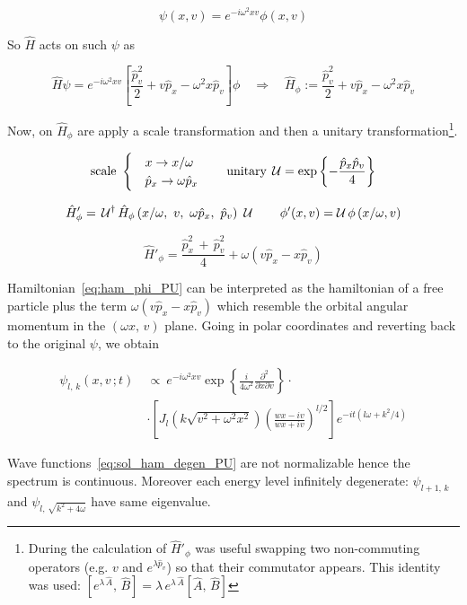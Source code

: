 \begin{equation*}
  \psi(x, v) = e^{-i\omega^2xv}\phi(x,v)
\end{equation*}

So $\hat{H}$ acts on such $\psi$ as

\begin{equation*}
  \hat{H} \psi = e^{-i\omega^2xv}
  \left[\frac{\hat{p}_v^2}{2} + v\hat{p}_x - \omega^2x\hat{p}_v \right] \phi
  \quad \Rightarrow \quad
  \hat{H}_{\phi} :=
  \frac{\hat{p}_v^2}{2} + v\hat{p}_x - \omega^2x\hat{p}_v
\end{equation*}

Now, on $\hat{H}_{\phi}$ are apply a scale transformation and then a unitary
transformation\footnote{
  During the calculation of $\hat{H}'_{\phi}$ was useful swapping
  two non-commuting operators (e.g. $v$ and $e^{\lambda \hat{p}_v}$)
  so that their commutator appears. This identity was used:
  $\left[e^{\lambda \, \hat{A}}, \, \hat{B}\right] =
  \lambda \, e^{\lambda \, \hat{A}} \left[\hat{A} , \, \hat{B} \right]$
}.

\begin{equation*}
  \text{scale} \
  \begin{cases}
    &x         \rightarrow x/\omega \\
    &\hat{p}_x \rightarrow \omega\hat{p}_x
  \end{cases}
  \qquad \text{unitary} \;
  \operatorname{\mathcal{U}} = \exp\left\{ - \frac{\hat{p}_x \hat{p}_v}{4}\right\}
\end{equation*}

\begin{equation*}
  \hat{H}'_{\phi} = \, \U^{\dagger}
  \hat{H}_{\phi} \left(x/\omega,\ v,\ \omega \hat{p}_x,\ \hat{p}_v\right)
  \ \U \qquad
  \phi'(x, v) = \U \phi\left(x/\omega, v\right)
\end{equation*}

\begin{equation} \label{eq:ham_phi_PU}
  \hat{H}'_{\phi} = \frac{\hat{p}^2_x \, + \, \hat{p}^2_{v}}{4}
  + \omega \left(v \hat{p}_x - x \hat{p}_v \right)
\end{equation}

Hamiltonian~\eqref{eq:ham_phi_PU} can be interpreted as the hamiltonian of a
free particle plus the term $\omega \left(v \hat{p}_x - x \hat{p}_v \right)$
which resemble the orbital angular momentum in the $(\omega x, \, v)$ plane.
Going in polar coordinates and reverting back to the original $\psi$, we obtain

\begin{align} \label{eq:sol_ham_degen_PU}
  \psi_{l, \, k}(x, v \,; t) \ &\propto \
  e^{-i\omega^2xv}
  \exp\left\{
    \frac{i}{4\omega^2} \frac{\partial^2}{\partial x \partial v}
  \right\} \cdot \nonumber \\
  &\cdot \left[
    J_l \left(k\sqrt{v^2 + \omega^2 x^2}\right)
    {\left( \frac{wx - iv}{wx +iv} \right)}^{l/2}
  \right]
  e^{-it (l\omega + k^2/4)}
\end{align}

Wave functions~\eqref{eq:sol_ham_degen_PU} are not normalizable hence the
spectrum is continuous. Moreover each energy level infinitely degenerate:
$\psi_{l+1, \, k}$ and $\psi_{l, \, \sqrt{k^2 + 4 \omega}}$ have same
eigenvalue.
